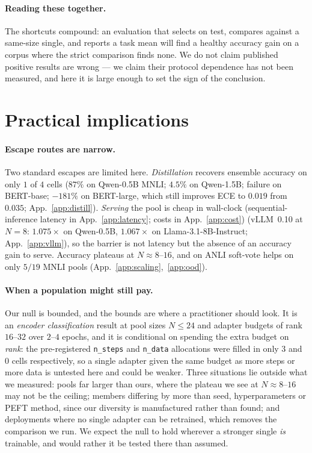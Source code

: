 \documentclass[11pt]{article}
\begin{document}
\paragraph{Reading these together.} The shortcuts compound: an evaluation that selects on test, compares against a same-size single, and reports a task mean will find a healthy accuracy gain on a corpus where the strict comparison finds none. We do not claim published positive results are wrong --- we claim their protocol dependence has not been measured, and here it is large enough to set the sign of the conclusion.

\section{Practical implications}\label{sec:distill}\label{sec:discussion}

\paragraph{Escape routes are narrow.} Two standard escapes are limited here. \emph{Distillation} \citep{hinton2015distilling} recovers ensemble accuracy on only $1$ of $4$ cells ($87\%$ on Qwen-0.5B MNLI; $4.5\%$ on Qwen-1.5B; failure on BERT-base; $-181\%$ on BERT-large, which still improves ECE to $0.019$ from $0.035$; App.~\ref{app:distill}). \emph{Serving} the pool is cheap in wall-clock (sequential-inference latency in App.~\ref{app:latency}; costs in App.~\ref{app:cost}) (vLLM~0.10 at $N{=}8$: $1.075\times$ on Qwen-0.5B, $1.067\times$ on Llama-3.1-8B-Instruct; App.~\ref{app:vllm}), so the barrier is not latency but the absence of an accuracy gain to serve. Accuracy plateaus at $N{\approx}8$--$16$, and on ANLI soft-vote helps on only $5/19$ MNLI pools (App.~\ref{app:scaling},~\ref{app:ood}).

\paragraph{When a population might still pay.} Our null is bounded, and the bounds are where a practitioner should look. It is an \emph{encoder classification} result at pool sizes $N\!\leq\!24$ and adapter budgets of rank $16$--$32$ over $2$--$4$ epochs, and it is conditional on spending the extra budget on \emph{rank}: the pre-registered \texttt{n\_steps} and \texttt{n\_data} allocations were filled in only $3$ and $0$ cells respectively, so a single adapter given the same budget as more steps or more data is untested here and could be weaker. Three situations lie outside what we measured: pools far larger than ours, where the plateau we see at $N\!\approx\!8$--$16$ may not be the ceiling; members differing by more than seed, hyperparameters or PEFT method, since our diversity is manufactured rather than found; and deployments where no single adapter can be retrained, which removes the comparison we run. We expect the null to hold wherever a stronger single \emph{is} trainable, and would rather it be tested there than assumed.
\end{document}
